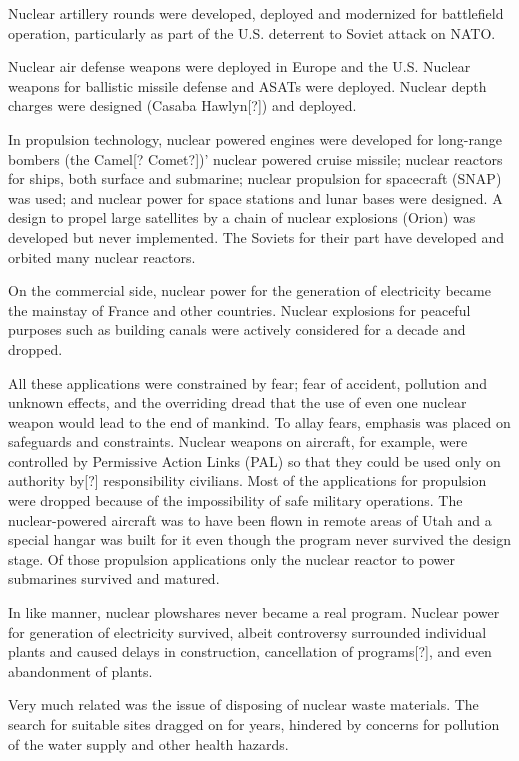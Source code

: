 Nuclear artillery rounds were developed, deployed and modernized for battlefield operation, particularly as part of the U.S. deterrent to Soviet attack on NATO.

Nuclear air defense weapons were deployed in Europe and the U.S. Nuclear weapons for ballistic missile defense and ASATs were deployed. Nuclear depth charges were designed (Casaba Hawlyn[?]) and deployed.

In propulsion technology, nuclear powered engines were developed for long-range bombers (the Camel[? Comet?])' nuclear powered cruise missile; nuclear reactors for ships, both surface and submarine; nuclear propulsion for spacecraft (SNAP) was used; and nuclear power for space stations and lunar bases were designed. A design to propel large satellites by a chain of nuclear explosions (Orion) was developed but never implemented. The Soviets for their part have developed and orbited many nuclear reactors.

On the commercial side, nuclear power for the generation of electricity became the mainstay of France and other countries. Nuclear explosions for peaceful purposes such as building canals were actively considered for a decade and dropped.

All these applications were constrained by fear; fear of accident, pollution and unknown effects, and the overriding dread that the use of even one nuclear weapon would lead to the end of mankind. To allay fears, emphasis was placed on safeguards and constraints. Nuclear weapons on aircraft, for example, were controlled by Permissive Action Links (PAL) so that they could be used only on authority by[?] responsibility civilians. Most of the applications for propulsion were dropped because of the impossibility of safe military operations. The nuclear-powered aircraft was to have been flown in remote areas of Utah and a special hangar was built for it even though the program never survived the design stage. Of those propulsion applications only the nuclear reactor to power submarines survived and matured.

In like manner, nuclear plowshares never became a real program. Nuclear power for generation of electricity survived, albeit controversy surrounded individual plants and caused delays in construction, cancellation of programs[?], and even abandonment of plants.

Very much related was the issue of disposing of nuclear waste materials. The search for suitable sites dragged on for years, hindered by concerns for pollution of the water supply and other health hazards.

